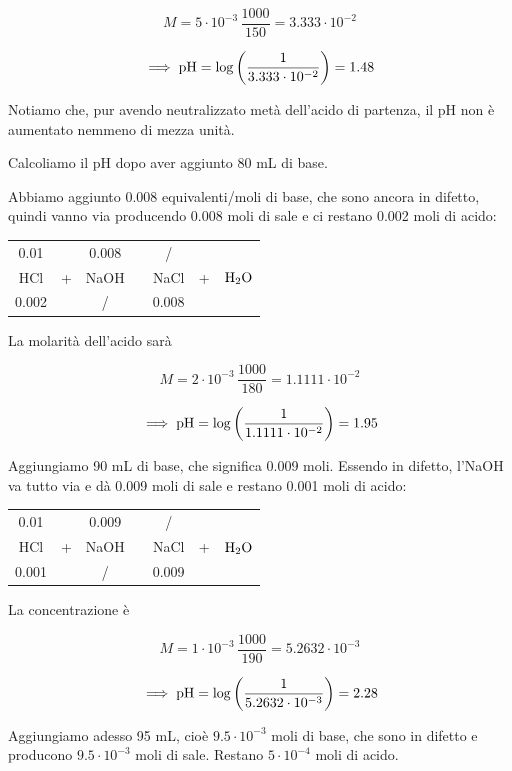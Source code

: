 $$M=5 \cdot 10^{-3} \, \frac{1000}{150}=3.333 \cdot 10^{-2}$$

$$\implies \rm pH = \log \left( \frac{1}{3.333 \cdot 10^{-2}} \right)=1.48$$

Notiamo che, pur avendo neutralizzato metà dell'acido di partenza, il pH non è aumentato nemmeno di mezza unità.

\vspace{0.2cm}Calcoliamo il pH dopo aver aggiunto 80 mL di base.

Abbiamo aggiunto 0.008 equivalenti/moli di base, che sono ancora in difetto, quindi vanno via producendo 0.008 moli di sale e ci restano 0.002 moli di acido:

\begin{center}
    \begin{tabular}{ccccccc}
        0.01 &  & 0.008 & & / & &\\
        HCl & + & NaOH & \ce{->} & NaCl & + & $\rm H_2O$\\
        0.002 &  &  / & & 0.008 & &\\
    \end{tabular}
\end{center}

La molarità dell'acido sarà

$$M=2 \cdot 10^{-3} \, \frac{1000}{180}=1.1111 \cdot 10^{-2}$$

$$\implies \rm pH = \log \left( \frac{1}{1.1111 \cdot 10^{-2}} \right)=1.95$$


Aggiungiamo 90 mL di base, che significa 0.009 moli. Essendo in difetto, l'NaOH va tutto via e dà 0.009 moli di sale e restano 0.001 moli di acido:

\begin{center}
    \begin{tabular}{ccccccc}
        0.01 &  & 0.009 & & / & &\\
        HCl & + & NaOH & \ce{->} & NaCl & + & $\rm H_2O$\\
        0.001 &  &  / & & 0.009 & &\\
    \end{tabular}
\end{center}

La concentrazione è

$$M=1 \cdot 10^{-3} \, \frac{1000}{190}=5.2632 \cdot 10^{-3}$$

$$\implies \rm pH = \log \left( \frac{1}{5.2632 \cdot 10^{-3}} \right)=2.28$$

Aggiungiamo adesso 95 mL, cioè $9.5 \cdot 10^{-3}$ moli di base, che sono in difetto e producono $9.5 \cdot 10^{-3}$ moli di sale. Restano $5 \cdot 10^{-4}$ moli di acido.

